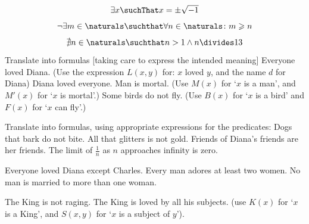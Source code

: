 \documentclass{report}
\renewcommand{\geq}{\geqslant}
\begin{document}
\begin{Answer} [number=31.1]
\begin{displaymath}
\exists{x} \suchThat x = \pm \sqrt{-1}
\end{displaymath}
\end{Answer}


\begin{Answer} [number=31.2]
\begin{displaymath}
\neg \exists{m \in \naturals} \suchthat \forall{n \in \naturals} \colon m \geq n
\end{displaymath}
\end{Answer}

\begin{Answer}
  \begin{displaymath}
    \nexists{n \in \naturals} \suchthat n > 1 \land n \divides 13
  \end{displaymath}
\end{Answer}


\begin{Exercise} [number=32]
  Translate into formulas [taking care to express the intended meaning]
  \Question Everyone loved Diana. (Use the expression $L(x,y)$ for: $x$ loved $y$, and the name $d$ for Diana)
  \Question Diana loved everyone.
  \Question Man is mortal. (Use $M(x)$ for `$x$ is a man', and $M\prime(x)$ for `$x$ is mortal'.)
  \Question Some birds do not fly. (Use $B(x)$ for `$x$ is a bird' and $F(x)$ for `$x$ can fly'.)
\end{Exercise}

\begin{Exercise} [number=33]
  Translate into formulas, using appropriate expressions for the predicates:
  \Question Dogs that bark do not bite.
  \Question All that glitters is not gold.
  \Question Friends of Diana's friends are her friends.
  \Question The limit of $\frac{1}{n}$ as $n$ approaches infinity is zero.
\end{Exercise}

\begin{Exercise} [number=34]
  \Question Everyone loved Diana except Charles.
  \Question Every man adores at least two women.
  \Question No man is married to more than one woman.
\end{Exercise}

\begin{Exercise} [number=35]
  \Question The King is not raging.
  \Question The King is loved by all his subjects. (use $K(x)$ for `$x$ is a King', and $S(x,y)$ for `$x$ is a subject of $y$').
\end{Exercise}
\end{document}
